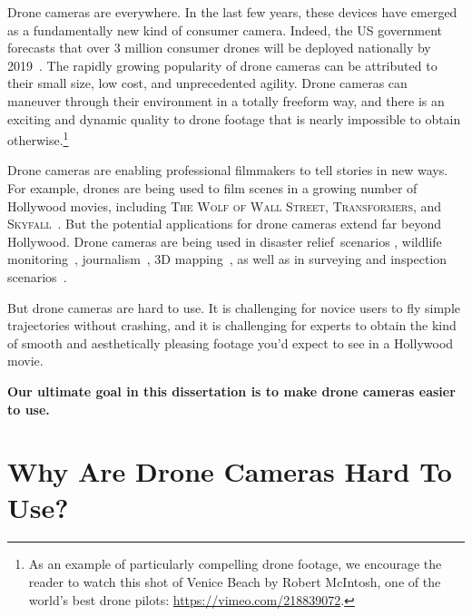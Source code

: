 Drone cameras are everywhere.
In the last few years, these devices have emerged as a fundamentally new kind of consumer camera.
Indeed, the US government forecasts that over 3 million consumer drones will be deployed nationally by 2019~\cite{faa:2017}.
The rapidly growing popularity of drone cameras can be attributed to their small size, low cost, and unprecedented agility.
Drone cameras can maneuver through their environment in a totally freeform way, and there is an exciting and dynamic quality to drone footage that is nearly impossible to obtain otherwise.\footnote{As an example of particularly compelling drone footage, we encourage the reader to watch this shot of Venice Beach by Robert McIntosh, one of the world's best drone pilots: \url{https://vimeo.com/218839072}.}

Drone cameras are enabling professional filmmakers to tell stories in new ways. 
For example, drones are being used to film scenes in a growing number of Hollywood movies, including \textsc{The Wolf of Wall Street}, \textsc{Transformers}, and \textsc{Skyfall}~\cite{nyt:2014,wsj:2015}.
But the potential applications for drone cameras extend far beyond Hollywood.
Drone cameras are being used in disaster relief~scenarios \cite{michael:2012}, wildlife monitoring~\cite{duke:2017}, journalism~\cite{indivisible:2017}, 3D mapping~\cite{pix4d:2015}, as well as in surveying and inspection scenarios~\cite{3dr:2017a}.

But drone cameras are hard to use.
It is challenging for novice users to fly simple trajectories without crashing, and it is challenging for experts to obtain the kind of smooth and aesthetically pleasing footage you'd expect to see in a Hollywood movie.

\begin{tcolorbox}[before skip=20pt, after skip=20pt, sharp corners]
\begin{center}
\textbf{Our ultimate goal in this dissertation is to make drone cameras easier to use.}
\end{center}
\end{tcolorbox}

\section{Why Are Drone Cameras Hard To Use?}


